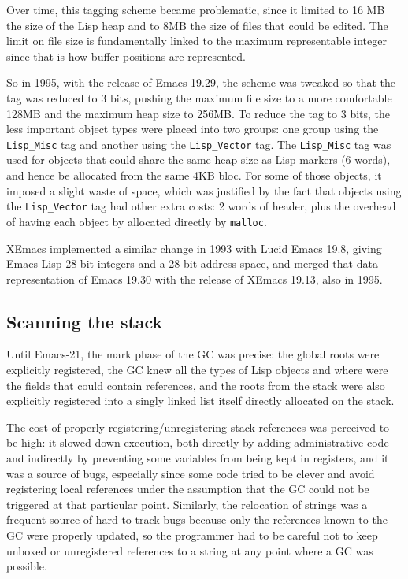 \documentclass[format=acmsmall, review=false, screen=true]{acmart}
\begin{document}
Over time, this tagging scheme became problematic, since it limited to 16 MB
the size of the Lisp heap and to 8MB the size of files that could be edited.
The limit on file size is fundamentally linked to the maximum representable
integer since that is how buffer positions are represented.

So in 1995, with the release of Emacs-19.29,
the scheme was tweaked so that the tag was reduced to
3 bits, pushing the maximum file size to a more comfortable 128MB and the
maximum heap size to 256MB.  To reduce the tag to 3 bits, the less important
object types were placed into two groups: one group using the
\texttt{Lisp\_Misc} tag and another using the \texttt{Lisp\_Vector} tag.
The \texttt{Lisp\_Misc} tag was used for objects that could share the same
heap size as Lisp markers (6 words), and hence be allocated from the same
4KB bloc.  For some of those objects, it imposed a slight waste of space,
which was justified by the fact that objects using the \texttt{Lisp\_Vector}
tag had other extra costs: 2 words of header, plus the overhead of having
each object by allocated directly by \texttt{malloc}.

XEmacs implemented a similar change in 1993 with Lucid Emacs 19.8,
giving Emacs Lisp 28-bit integers and a 28-bit address space, and
merged that data representation of Emacs 19.30 with the release of XEmacs 19.13, also in
1995.

\subsection{Scanning the stack}
\label{sec:stack-scanning}

Until Emacs-21, the mark phase of the GC was precise: the global roots were
explicitly registered, the GC knew all the types of Lisp objects and where
were the fields that could contain references, and the roots from the stack
were also explicitly registered into a singly linked list itself directly
allocated on the stack.

The cost of properly registering/unregistering stack references was
perceived to be high: it slowed down execution, both directly by adding
administrative code and indirectly by preventing some variables from being
kept in registers, and it was a source of bugs, especially since some code
tried to be clever and avoid registering local references under the
assumption that the GC could not be triggered at that particular point.
Similarly, the relocation of strings was a frequent source of hard-to-track
bugs because only the references known to the GC were properly updated, so
the programmer had to be careful not to keep unboxed or unregistered
references to a string at any point where a GC was possible.
\end{document}
